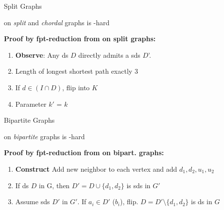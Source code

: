 \begin{frame}[c]{Split Graphs}

    \begin{tcolorbox}[colback=TUMBlueLighter]
        \sdom on \textit{split} and \textit{chordal} graphs is \WTWOhs-hard
    \end{tcolorbox}

    \pause\begin{figure}[!ht]
    \end{figure}

    \textbf{Proof by  fpt-reduction from \dom on split graphs:}

    \begin{enumerate}
      \pause  \item \textbf{Observe}: Any ds $D$ directly admits a sds $D$'.
      \pause  \item Length of longest shortest path exactly $3$
      \pause  \item If $d \in (I \cap D)$, flip into $K$
      \pause  \item Parameter $k'$ = $k$
    \end{enumerate}

\end{frame}

\begin{frame}[c]{Bipartite Graphs}

    \begin{tcolorbox}[colback=TUMBlueLighter]
        \sdom on \textit{bipartite} graphs is \WTWOhs-hard
    \end{tcolorbox}

    \pause\begin{figure}[!ht]
    \end{figure}

    \textbf{Proof by fpt-reduction from \dom on bipart. graphs:}

    \begin{enumerate}
     \pause   \item \textbf{Construct } Add new neighbor to each vertex and add $d_1,d_2,u_1,u_2$
     \pause   \item If ds $D$ in G, then $D' = D \cup \{d_1,d_2\}$ is sds in $G'$
     \pause   \item Assume sds $D'$ in $G'$. If $a_i \in D'$ ($b_i$), flip. $D = D' \setminus \{d_1,d_2\}$ is ds in $G$
    \end{enumerate}

    \end{frame}



